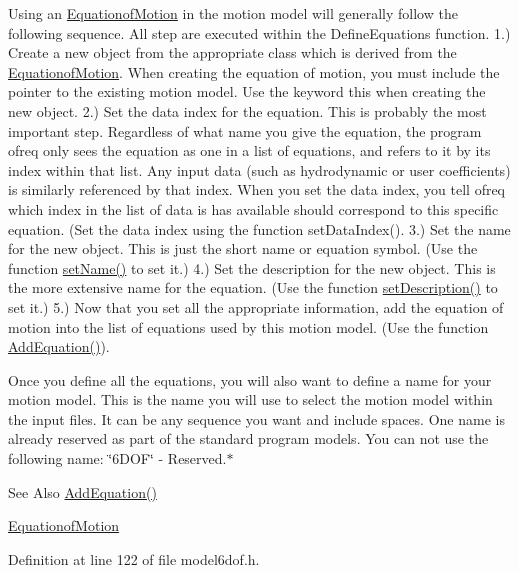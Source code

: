 Using an \hyperlink{classosea_1_1ofreq_1_1_equationof_motion}{Equationof\-Motion} in the motion model will generally follow the following sequence. All step are executed within the Define\-Equations function. 1.) Create a new object from the appropriate class which is derived from the \hyperlink{classosea_1_1ofreq_1_1_equationof_motion}{Equationof\-Motion}. When creating the equation of motion, you must include the pointer to the existing motion model. Use the keyword this when creating the new object. 2.) Set the data index for the equation. This is probably the most important step. Regardless of what name you give the equation, the program ofreq only sees the equation as one in a list of equations, and refers to it by its index within that list. Any input data (such as hydrodynamic or user coefficients) is similarly referenced by that index. When you set the data index, you tell ofreq which index in the list of data is has available should correspond to this specific equation. (Set the data index using the function set\-Data\-Index(). 3.) Set the name for the new object. This is just the short name or equation symbol. (Use the function \hyperlink{classosea_1_1ofreq_1_1_motion_model_a42d989727028c18c59ba04f958bc7b74}{set\-Name()} to set it.) 4.) Set the description for the new object. This is the more extensive name for the equation. (Use the function \hyperlink{classosea_1_1ofreq_1_1_motion_model_a5097540bb98ad753594d41890e6ef30d}{set\-Description()} to set it.) 5.) Now that you set all the appropriate information, add the equation of motion into the list of equations used by this motion model. (Use the function \hyperlink{classosea_1_1ofreq_1_1_motion_model_a73489d88c07b26109bbb9bdd0a576b30}{Add\-Equation()}).

Once you define all the equations, you will also want to define a name for your motion model. This is the name you will use to select the motion model within the input files. It can be any sequence you want and include spaces. One name is already reserved as part of the standard program models. You can not use the following name\-: \char`\"{}6\-D\-O\-F\char`\"{} -\/ Reserved.$\ast$

\begin{DoxySeeAlso}{See Also}
\hyperlink{classosea_1_1ofreq_1_1_motion_model_a73489d88c07b26109bbb9bdd0a576b30}{Add\-Equation()} 

\hyperlink{classosea_1_1ofreq_1_1_equationof_motion}{Equationof\-Motion} 
\end{DoxySeeAlso}


Definition at line 122 of file model6dof.\-h.



